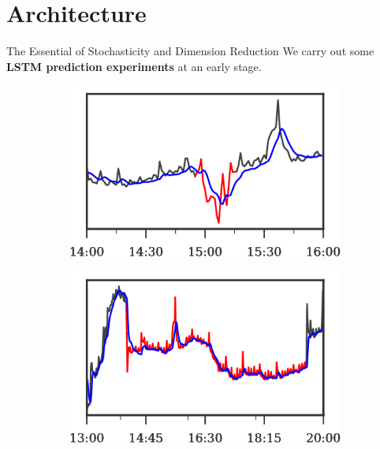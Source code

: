 \documentclass[usenames,dvipsnames]{beamer}
\newcommand{\emphasis}[1]{\textbf{\textcolor{emphcolor}{#1}}}
\begin{document}
\section{Architecture}

\begin{frame}{The Essential of Stochasticity and Dimension Reduction}
  We carry out some \emphasis{LSTM prediction experiments} at an early stage.
  
  \vspace{-.5em}
  \begin{figure}
    \begin{subfigure}[t]{.49\columnwidth}
      \centering
      \includegraphics[height=.3\textheight]{kpi_lstm-regression}
    \end{subfigure}\hfill
    \begin{subfigure}[t]{.49\columnwidth}
      \centering
      \includegraphics[height=.3\textheight]{kpi_lstm-regression_2}
    \end{subfigure}
  \end{figure}
  \vspace{-.5em}
    

\end{frame}
\end{document}
